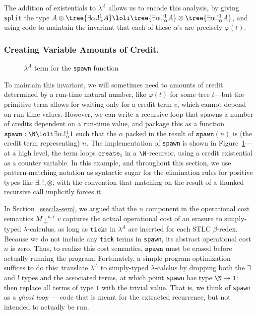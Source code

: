 The addition of existentials to $\lambda^A$ allows us to encode this analysis, by giving \texttt{split} the type $A \otimes \tree {\exists   \alpha.!^1_\alpha A} \loli \tree {\exists \alpha.!^1_\alpha A} \otimes \tree {\exists \alpha.!^1_\alpha A}$, and using code to maintain the invariant that each of these $\alpha$'s are precisely $\varphi(t)$.


\subsubsection{Creating Variable Amounts of Credit.}

\begin{figure}
  \vspace{-0.1in}
  
  \vspace{-0.2in}
  \caption{$\lambda^A$ term for the \texttt{spawn} function}
  \label{fig:ghost-loop}
\end{figure}

To maintain this invariant, we will sometimes need to \waitname\/ amounts of credit determined by a run-time natural number, like $\varphi(t)$ for some tree $t$---but the primitive  term allows for waiting only for a credit term $c$, which cannot depend on run-time values.
However, we can write a recursive loop that spawns a number of credits
dependent on a run-time value, and package this as a function
$\texttt{spawn} : \N \loli \exists \alpha . !^1_\alpha 1$
such that the $\alpha$ packed in the result of $\texttt{spawn}(n)$ is (the credit term representing) $n$.
The implementation of \texttt{spawn}\/ is shown in Figure~\ref{fig:ghost-loop}---at a high level,
the term loops $\texttt{create}_1$ in a $\N$-recursor, using a credit existential as a counter variable.
In this example, and throughout this section, we use pattern-matching notation as syntactic sugar for the elimination rules for positive types like $\exists,!,\otimes$, with the convention that matching on the result of a thunked recursive call implicitly forces it.

In Section~\ref{ssec:la-sem}, we argued that
the $n$ component in the operational cost semantics $M \downarrow^{n,r} v$ captures the actual operational cost of an erasure to simply-typed $\lambda$-calculus, as long as $\texttt{tick}$s in $\lambda^A$ are inserted for each STLC $\beta$-redex.  Because we do not include any \texttt{tick} terms in \texttt{spawn}, its abstract operational cost $n$ is zero.  Thus, to realize this cost semantics, $\texttt{spawn}$ must be erased before actually running the program.  Fortunately, a simple program optimization suffices to do this: translate $\lambda^A$ to simply-typed $\lambda$-calclus by dropping both the $\exists$ and $!$ types and the associated terms, at which point \texttt{spawn} has type $\N \to 1$; then replace all terms of type $1$ with the trivial value.
That is, we think of \texttt{spawn} as a \emph{ghost loop} --- code that is meant for the extracted recurrence, but not intended to actually be run.  

